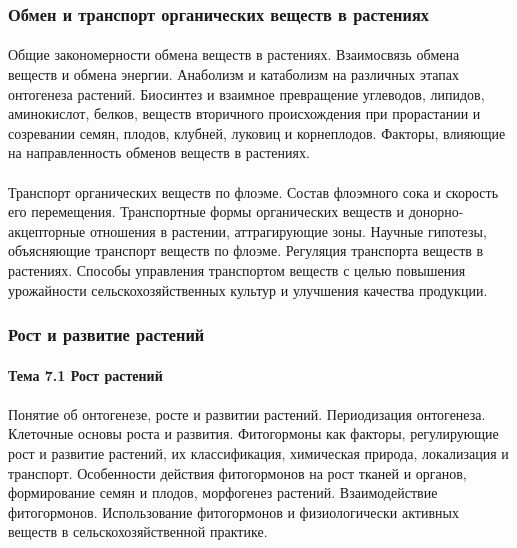 \subsubsection{Обмен и транспорт органических веществ в растениях}

\paragraph*{}Общие закономерности обмена веществ в растениях. Взаимосвязь обмена веществ и обмена энергии. Анаболизм и катаболизм на различных этапах онтогенеза растений. Биосинтез и взаимное превращение углеводов, липидов, аминокислот, белков, веществ вторичного происхождения при прорастании и созревании семян, плодов, клубней, луковиц и корнеплодов. Факторы, влияющие на направленность обменов веществ в растениях.

\paragraph*{}Транспорт органических веществ по флоэме. Состав флоэмного сока и скорость его перемещения. Транспортные формы органических веществ и донорно-акцепторные отношения в растении, аттрагирующие зоны. Научные гипотезы, объясняющие транспорт веществ по флоэме. Регуляция транспорта веществ в растениях. Способы управления транспортом веществ с целью повышения урожайности сельскохозяйственных культур и улучшения качества продукции.

\subsubsection{Рост и развитие растений}

\paragraph*{Тема 7.1 Рост растений}

\paragraph*{}Понятие об онтогенезе, росте и развитии растений. Периодизация онтогенеза. Клеточные основы роста и развития. Фитогормоны как факторы, регулирующие рост и развитие растений, их классификация, химическая природа, локализация и транспорт. Особенности действия фитогормонов на рост тканей и органов, формирование семян и плодов, морфогенез растений. Взаимодействие фитогормонов. Использование фитогормонов и физиологически активных веществ в сельскохозяйственной практике.


